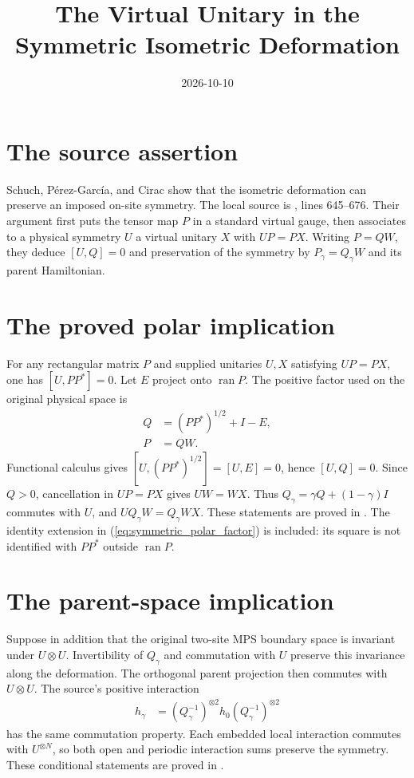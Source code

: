 \documentclass{article}
\title{The Virtual Unitary in the Symmetric Isometric Deformation}
\author{}
\date{2026-10-10}
\begin{document}
\maketitle
{}

\section{The source assertion}
Schuch, P\'erez-Garc\'ia, and Cirac \cite{Schuch2011Phases} show that the
isometric deformation can preserve an imposed on-site symmetry.
The local source is , lines 645--676.
Their argument first puts the tensor map $P$ in a standard virtual gauge,
then associates to a physical symmetry $U$ a virtual unitary $X$ with
$UP=PX$. Writing $P=QW$, they deduce $[U,Q]=0$ and preservation of the
symmetry by $P_\gamma=Q_\gamma W$ and its parent Hamiltonian.

\section{The proved polar implication}
For any rectangular matrix $P$ and supplied unitaries $U,X$ satisfying
$UP=PX$, one has $[U,PP^*]=0$. Let $E$ project onto $\operatorname{ran}P$.
The positive factor used on the original physical space is
\begin{align}
    Q&=(PP^*)^{1/2}+I-E,
    \label{eq:symmetric_polar_factor}\\
    P&=QW.
    \label{eq:symmetric_polar_identity}
\end{align}
Functional calculus gives $[U,(PP^*)^{1/2}]=[U,E]=0$, hence $[U,Q]=0$.
Since $Q>0$, cancellation in $UP=PX$ gives $UW=WX$.
Thus $Q_\gamma=\gamma Q+(1-\gamma)I$ commutes with $U$, and
$UQ_\gamma W=Q_\gamma WX$.
These statements are proved in
.
The identity extension in (\ref{eq:symmetric_polar_factor}) is included:
its square is not identified with $PP^*$ outside $\operatorname{ran}P$.

\section{The parent-space implication}
Suppose in addition that the original two-site MPS boundary space is
invariant under $U\otimes U$. Invertibility of $Q_\gamma$ and commutation
with $U$ preserve this invariance along the deformation. The orthogonal
parent projection then commutes with $U\otimes U$. The source's positive
interaction
\begin{align}
    h_\gamma
        &=(Q_\gamma^{-1})^{\otimes2}h_0(Q_\gamma^{-1})^{\otimes2}
    \label{eq:symmetric_polar_interaction}
\end{align}
has the same commutation property. Each embedded local interaction
commutes with $U^{\otimes N}$, so both open and periodic interaction sums
preserve the symmetry.
These conditional statements are proved in
.
\end{document}
